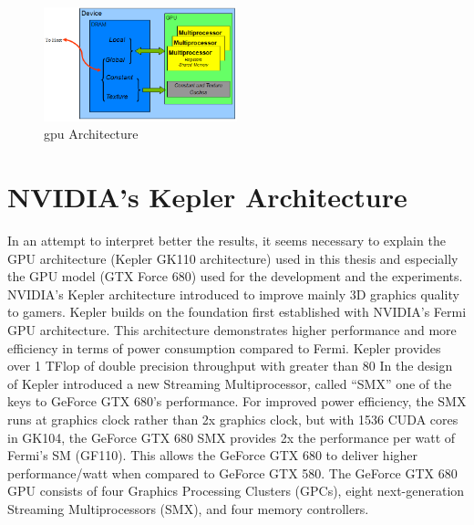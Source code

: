 \begin{figure}[h]
   \centering
       \includegraphics[width=0.5\textwidth]{gpu}
   \caption{gpu Architecture}
   \label{fig:gpuarch}
\end{figure}

\section{NVIDIA's Kepler Architecture}
In an attempt to interpret better the results, it seems necessary to explain the GPU architecture (Kepler GK110 architecture) used in this thesis and especially the GPU model (GTX Force 680) used for the development and the experiments.
NVIDIA’s Kepler architecture introduced to improve mainly 3D graphics quality to gamers. Kepler builds on the foundation first established with NVIDIA's Fermi GPU architecture. This architecture demonstrates higher performance and more efficiency in terms of power consumption compared to Fermi. Kepler provides over 1 TFlop of double precision throughput with greater than 80%
 In the design of Kepler introduced a new Streaming Multiprocessor, called “SMX” one of the keys to GeForce GTX 680’s performance. For improved power efficiency, the SMX runs at graphics clock rather than 2x graphics clock, but with 1536 CUDA cores in GK104, the GeForce GTX 680 SMX provides 2x the performance per watt of Fermi’s SM (GF110). This allows the GeForce GTX 680 to deliver higher performance/watt when compared to GeForce GTX 580. The GeForce GTX 680 GPU consists of four Graphics Processing Clusters (GPCs), eight next-generation Streaming Multiprocessors (SMX), and four memory controllers.
 
